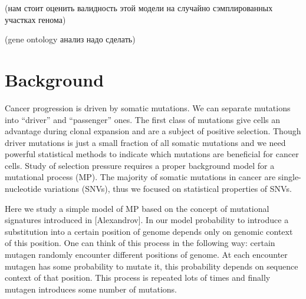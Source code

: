 \documentclass[a4paper]{article}
\begin{document}

(нам стоит оценить валидность этой модели на случайно сэмплированных участках генома)

(gene ontology анализ надо сделать)





\section*{Background}
Cancer progression is driven by somatic mutations. We can separate mutations into ``driver'' and ``passenger'' ones. The first class of mutations give cells an advantage during clonal expansion and are a subject of positive selection. Though driver mutations is just a small fraction of all somatic mutations and we need powerful statistical methods to indicate which mutations are beneficial for cancer cells. Study of selection pressure requires a proper background model for a mutational process (MP). The majority of somatic mutations in cancer are single-nucleotide variations (SNVs), thus we focused on statistical properties of SNVs.

Here we study a simple model of MP based on the concept of mutational signatures introduced in [Alexandrov]. In our model probability to introduce a substitution into a certain position of genome depends only on genomic context of this position. One can think of this process in the following way: certain mutagen randomly encounter different positions of genome. At each encounter mutagen has some probability to mutate it, this probability depends on sequence context of that position. This process is repeated lots of times and finally mutagen introduces some number of mutations.
\end{document}
